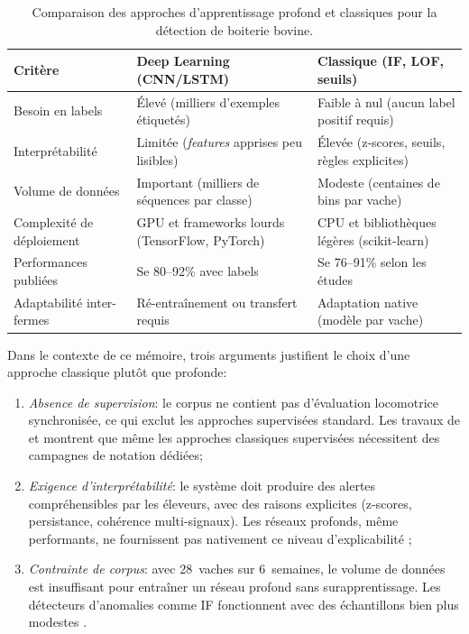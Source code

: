 \begin{table}[H]
    \centering
    \caption{Comparaison des approches d'apprentissage profond et classiques pour la détection
    de boiterie bovine.}
    \label{tab:deep_vs_classique}
    \begin{tabular}{>{\raggedright\arraybackslash}p{3.2cm}
                    >{\raggedright\arraybackslash}p{4.5cm}
                    >{\raggedright\arraybackslash}p{4.5cm}}
        \toprule
        \textbf{Critère} & \textbf{Deep Learning (CNN/LSTM)}
        & \textbf{Classique (IF, LOF, seuils)} \\
        \midrule
        Besoin en labels
        & Élevé (milliers d'exemples étiquetés)
        & Faible à nul (aucun label positif requis) \\
        \addlinespace
        Interprétabilité
        & Limitée (\textit{features} apprises peu lisibles)
        & Élevée (z-scores, seuils, règles explicites) \\
        \addlinespace
        Volume de données
        & Important (milliers de séquences par classe)
        & Modeste (centaines de bins par vache) \\
        \addlinespace
        Complexité de déploiement
        & GPU et frameworks lourds (TensorFlow, PyTorch)
        & CPU et bibliothèques légères (scikit-learn) \\
        \addlinespace
        Performances publiées
        & Se 80--92\% avec labels \citep{balasso2023behaviour}
        & Se 76--91\% selon les études \citep{alsaaod2012electronic,chapinal2010measurement} \\
        \addlinespace
        Adaptabilité inter-fermes
        & Ré-entraînement ou transfert requis
        & Adaptation native (modèle par vache) \\
        \bottomrule
    \end{tabular}
\end{table}

Dans le contexte de ce mémoire, trois arguments justifient le choix d'une approche classique
plutôt que profonde:
\begin{enumerate}
    \item \textit{Absence de supervision}: le corpus ne contient pas d'évaluation
    locomotrice synchronisée, ce qui exclut les approches supervisées standard. Les travaux de
    \cite{beer2016objective} et \cite{thorup2015lameness} montrent que même les approches
    classiques supervisées nécessitent des campagnes de notation dédiées;
    \item \textit{Exigence d'interprétabilité}: le système doit produire des alertes
    compréhensibles par les éleveurs, avec des raisons explicites (z-scores, persistance,
    cohérence multi-signaux). Les réseaux profonds, même performants, ne fournissent pas
    nativement ce niveau d'explicabilité \citep{rutten2013invited};
    \item \textit{Contrainte de corpus}: avec 28~vaches sur 6~semaines, le volume de données
    est insuffisant pour entraîner un réseau profond sans surapprentissage. Les détecteurs
    d'anomalies comme IF fonctionnent avec des échantillons bien plus modestes
    \citep{liu2008isolation}.
\end{enumerate}

